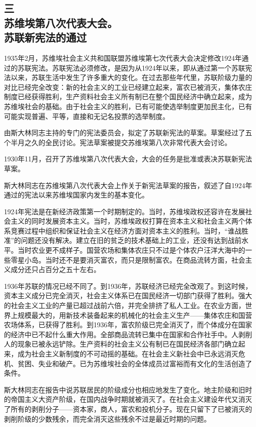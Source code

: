 \subsection[三\q 苏维埃第八次代表大会。苏联新宪法的通过]{三\\苏维埃第八次代表大会。\\苏联新宪法的通过}

1935年2月，苏维埃社会主义共和国联盟苏维埃第七次代表大会决定修改1924年通过的苏联宪法。苏联宪法必须修改，是因为从1924年以来，即从通过第一个苏联宪法以来，苏联生活中发生了许多重大的变化。在过去那些年代里，苏联阶级力量的对比已经完全改变：新的社会主义的工业已经建立起来，富农已被消灭，集体农庄制度已经获得胜利，生产资料社会主义所有制已在整个国民经济中确立起来，成为苏维埃社会的基础。由于社会主义的胜利，已有可能使选举制度更加民主化，已有可能实现普遍、平等，直接和无记名投票的选举制度。

由斯大林同志主持的专门的宪法委员会，拟定了苏联新宪法的草案。草案经过了五个半月之久的全民讨论。宪法草案被提交苏维埃第八次非常代表大会讨论。

1930年11月，召开了苏维埃第八次代表大会，大会的任务是批准或表决苏联新宪法草案。

斯大林同志在苏维埃第八次代表大会上作关于新宪法草案的报告，叙述了自1924年通过的宪法以来苏维埃国家内发生的基本变化。

1924年宪法是在新经济政策第一个时期制定的。当时，苏维埃政权还容许在发展社会主义的同时发展资本主义。当时，苏维埃政权打算在资本主义和社会主义两个体系竞赛过程中组织和保证社会主义在经济方面对资本主义的胜利。当时，“谁战胜准”的问题还没有解决。建立在旧的贫乏的技术基础上的工业，还没有达到战前水平。当时农业更不成样子。国营农场和集体农庄只不过是个体农户汪洋大海中的一些零星小岛。当时还不是要消灭富农，而只是限制富农。在商品流转方面，社会主义成分还只占百分之五十左右。

1936年苏联的情况已经不同了。到1936年，苏联经济已经完全改观了。到这时候，资本主义成分已完全消灭，社会主义体系已在国民经济一切部门获得了胜利。强大的社会主义工业的产量已超过战前六倍，并完全排挤了私人工业。在农业方面，世界上规模最大的，用新技术装备起来的机械化的社会主义生产——集体农庄和国营农场体系，已获得了胜利。到1936年，富农阶级已完全消灭了，而个体成分在国家的经济中已不起什么重大作用。全部商品流转已集中在国家和合作社手中。人剥削人的现象已被永远铲除。生产资料的社会主义公有制已在国民经济各部门确立起来，成为社会主义新制度的不可动摇的基础。在社会主义新社会中已永远消灭危机、贫困、失业和破产。已为苏维埃社会的全体成员过富裕而有文化的生活创造了条件。

斯大林同志在报告中说苏联居民的阶级成分也相应地发生了变化。地主阶级和旧时的帝国主义大资产阶级，在国内战争时期就被消灭了。在社会主义建设年代又消灭了所有的剥削分子——资本家，商人，富农和投机分子。现在只留下了已被消灭的剥削阶级的少数残余，而完全消灭这些残余不过是最近时期的问题。

